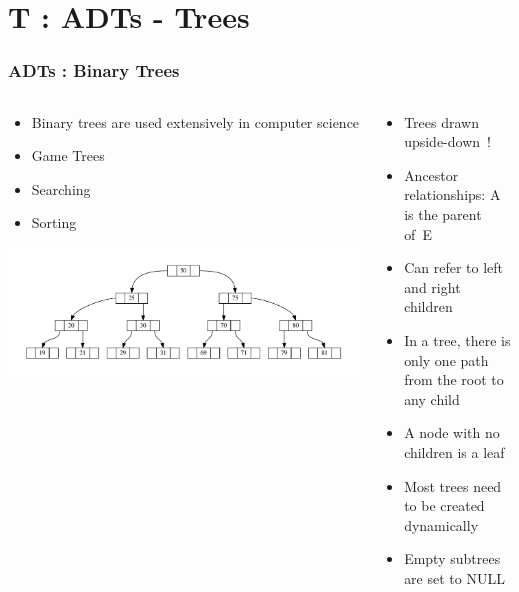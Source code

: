 \section{T : ADTs - Trees}
\label{chap:adts_trees}


\begin{frame}[fragile]
\frametitle{ADTs : Binary Trees}
\begin{columns}[T]

\begin{column}{0.45\textwidth}
\begin{itemize}[<+->]
\item Binary trees are used extensively in computer science	
\item Game Trees	
\item Searching	
\item Sorting	
\end{itemize}	
\pause
\begin{center}
\includegraphics[width=\textwidth]{../Images/Linkedb.pdf}	
\end{center}
\end{column}

\pause
\begin{column}{0.45\textwidth}
\begin{itemize}[<+->]
\item Trees drawn upside-down~!
\item Ancestor relationships: A is the parent of~E
\item Can refer to left and right children
\item In a tree, there is only one path from the root to any child
\item A node with no children is a leaf
\item Most trees need to be created dynamically
\item Empty subtrees are set to NULL
\end{itemize}
\end{column}

\end{columns}
\end{frame}

